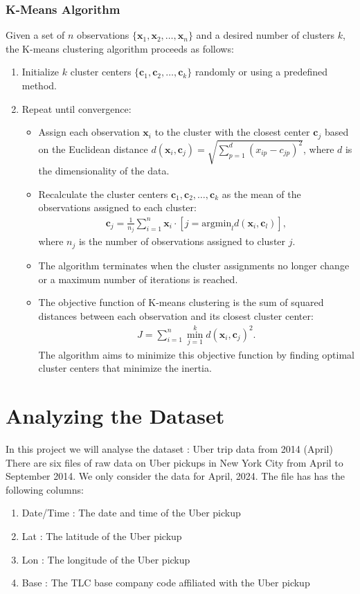 \documentclass[fleqn]{report}
\begin{document}
	\subsection{K-Means Algorithm}
	Given a set of $n$ observations $\{\mathbf{x}_1, \mathbf{x}_2, \dots, \mathbf{x}_n\}$ and a desired number of clusters $k$, the K-means clustering algorithm proceeds as follows:
	\begin{enumerate}
	\item Initialize $k$ cluster centers $\{\mathbf{c}_1, \mathbf{c}_2, \dots, \mathbf{c}_k\}$ randomly or using a predefined method.
	\item Repeat until convergence:
	\begin{itemize}
	\item Assign each observation $\mathbf{x}_i$ to the cluster with the closest center $\mathbf{c}_j$ based on the Euclidean distance $d(\mathbf{x}_i, \mathbf{c}_j) = \sqrt{\sum_{p=1}^d (x_{ip} - c_{jp})^2}$, where $d$ is the dimensionality of the data.\\
	\item Recalculate the cluster centers $\mathbf{c}_1, \mathbf{c}_2, \dots, \mathbf{c}_k$ as the mean of the observations assigned to each cluster:
	\begin{align}
	\mathbf{c}_j = \frac{1}{n_j} \sum_{i=1}^n \mathbf{x}_i \cdot [j = \mathrm{argmin}_l d(\mathbf{x}_i, \mathbf{c}_l)],
	\end{align}
	where $n_j$ is the number of observations assigned to cluster $j$.	
	\item The algorithm terminates when the cluster assignments no longer change or a maximum number of iterations is reached.	
	\item The objective function of K-means clustering is the sum of squared distances between each observation and its closest cluster center:
	\begin{align}
	J = \sum_{i=1}^n \min_{j=1}^k d(\mathbf{x}_i, \mathbf{c}_j)^2.
	\end{align}	
	The algorithm aims to minimize this objective function by finding optimal cluster centers that minimize the inertia.
	\end{itemize}
	\end{enumerate}
	\chapter{Analyzing the Dataset}
	In this project we will analyse the dataset : Uber trip data from 2014 (April)\\
	There are six files of raw data on Uber pickups in New York City from April to September 2014. We only consider the data for April, 2024. The file has has the following columns:
	\begin{enumerate}
		\item Date/Time : The date and time of the Uber pickup
		\item Lat : The latitude of the Uber pickup
		\item Lon : The longitude of the Uber pickup
		\item Base : The TLC base company code affiliated with the Uber pickup
	\end{enumerate}
\end{document}

